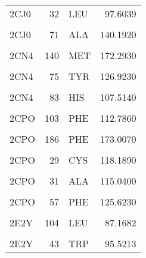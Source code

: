 \begin{table}
\begin{tabular}{lrlr}
			2CJ0 & 32 & LEU & 97.6039\\
			\cellcolor{gray!6}{2CJ0} & \cellcolor{gray!6}{57} & \cellcolor{gray!6}{PHE} & \cellcolor{gray!6}{126.1650}\\
			2CJ0 & 71 & ALA & 140.1920\\
			\addlinespace
			\cellcolor{gray!6}{2CN4} & \cellcolor{gray!6}{137} & \cellcolor{gray!6}{TYR} & \cellcolor{gray!6}{102.8860}\\
			2CN4 & 140 & MET & 172.2930\\
			\cellcolor{gray!6}{2CN4} & \cellcolor{gray!6}{55} & \cellcolor{gray!6}{TYR} & \cellcolor{gray!6}{136.9090}\\
			2CN4 & 75 & TYR & 126.9230\\
			\cellcolor{gray!6}{2CN4} & \cellcolor{gray!6}{77} & \cellcolor{gray!6}{LEU} & \cellcolor{gray!6}{53.5337}\\
			\addlinespace
			2CN4 & 83 & HIS & 107.5140\\
			\cellcolor{gray!6}{2CN4} & \cellcolor{gray!6}{84} & \cellcolor{gray!6}{THR} & \cellcolor{gray!6}{19.9645}\\
			2CPO & 103 & PHE & 112.7860\\
			\cellcolor{gray!6}{2CPO} & \cellcolor{gray!6}{183} & \cellcolor{gray!6}{GLU} & \cellcolor{gray!6}{105.9460}\\
			2CPO & 186 & PHE & 173.0070\\
			\addlinespace
			\cellcolor{gray!6}{2CPO} & \cellcolor{gray!6}{28} & \cellcolor{gray!6}{PRO} & \cellcolor{gray!6}{69.8826}\\
			2CPO & 29 & CYS & 118.1890\\
			\cellcolor{gray!6}{2CPO} & \cellcolor{gray!6}{30} & \cellcolor{gray!6}{PRO} & \cellcolor{gray!6}{65.4937}\\
			2CPO & 31 & ALA & 115.0400\\
			\cellcolor{gray!6}{2CPO} & \cellcolor{gray!6}{32} & \cellcolor{gray!6}{LEU} & \cellcolor{gray!6}{99.3621}\\
			\addlinespace
			2CPO & 57 & PHE & 125.6230\\
			\cellcolor{gray!6}{2CPO} & \cellcolor{gray!6}{71} & \cellcolor{gray!6}{ALA} & \cellcolor{gray!6}{137.2830}\\
			2E2Y & 104 & LEU & 87.1682\\
			\cellcolor{gray!6}{2E2Y} & \cellcolor{gray!6}{107} & \cellcolor{gray!6}{ILE} & \cellcolor{gray!6}{171.6940}\\
			2E2Y & 43 & TRP & 95.5213\\

\end{tabular}
\end{table}
